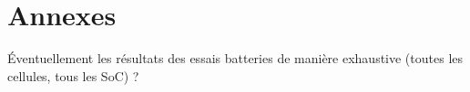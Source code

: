 \chapter*{Annexes}
Éventuellement les résultats des essais batteries de manière exhaustive (toutes les cellules, tous les SoC) ?